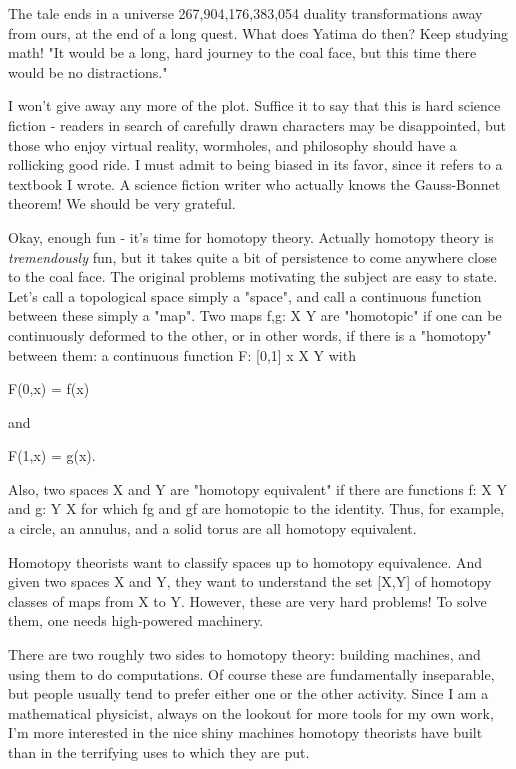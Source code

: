 The tale ends in a universe 267,904,176,383,054 duality transformations 
away from ours, at the end of a long quest.  What does Yatima do then?
Keep studying math!  "It would be a long, hard journey to the coal face,
but this time there would be no distractions."

I won't give away any more of the plot.  Suffice it to say that this is
hard science fiction - readers in search of carefully drawn characters
may be disappointed, but those who enjoy virtual reality, wormholes, and
philosophy should have a rollicking good ride.  I must admit to being
biased in its favor, since it refers to a textbook I wrote.  A science 
fiction writer who actually knows the Gauss-Bonnet theorem!  We should
be very grateful.

Okay, enough fun - it's time for homotopy theory.  Actually homotopy
theory is \emph{tremendously} fun, but it takes quite a bit of persistence to
come anywhere close to the coal face.  The original problems motivating
the subject are easy to state.  Let's call a topological space simply
a "space", and call a continuous function between these simply a "map".
Two maps f,g: X \to  Y are "homotopic" if one can be continuously deformed
to the other, or in other words, if there is a "homotopy" between them:
a continuous function F: [0,1] x X \to  Y with

F(0,x) = f(x)

and 

F(1,x) = g(x).  

Also, two spaces X and Y are "homotopy equivalent" if there are
functions f: X \to  Y and g: Y \to  X for which fg and gf are homotopic to
the identity.  Thus, for example, a circle, an annulus, and a solid
torus are all homotopy equivalent.

Homotopy theorists want to classify spaces up to homotopy equivalence.
And given two spaces X and Y, they want to understand the set [X,Y] of
homotopy classes of maps from X to Y.  However, these are very hard
problems!  To solve them, one needs high-powered machinery.

There are two roughly two sides to homotopy theory: building machines,
and using them to do computations.  Of course these are fundamentally
inseparable, but people usually tend to prefer either one or the other
activity.  Since I am a mathematical physicist, always on the lookout
for more tools for my own work, I'm more interested in the nice shiny
machines homotopy theorists have built than in the terrifying uses to
which they are put.  

